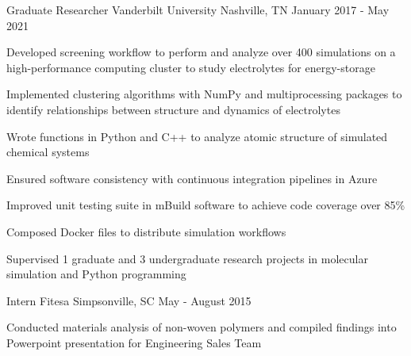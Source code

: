 
\begin{cventries}
  \cventry
    {Graduate Researcher} %
    {Vanderbilt University} %
    {Nashville, TN} %
    {January 2017 - May 2021} %
    {
        \begin{cvfirstitemstitle}
        \end{cvfirstitemstitle}
      \begin{cvsubitems} %
        \item{Developed screening workflow to perform and analyze over 400
            simulations on a high-performance \newline computing cluster to study
              electrolytes for energy-storage}
        \item{Implemented clustering algorithms with NumPy and multiprocessing
            packages to identify relationships \newline between structure and dynamics of
              electrolytes}
        \item{Wrote functions in Python and C++ to analyze atomic structure of
            simulated chemical systems}
      \end{cvsubitems}
      \begin{cvitemstitle}
      \end{cvitemstitle}
      \begin{cvsubitems}
        \item{Ensured software consistency with continuous integration
            pipelines in Azure}
        \item{Improved unit testing suite in mBuild software to achieve code coverage over
            85\%}
        \item{Composed Docker files to distribute simulation workflows}
        \item {Supervised 1 graduate and 3 undergraduate research 
            projects in molecular simulation and Python programming}
      \end{cvsubitems}
    }


  \cventry
    {Intern} %
    {Fitesa} %
    {Simpsonville, SC} %
    {May - August 2015} %
    {
      \begin{cvitems} %
        \item{Conducted materials analysis of non-woven polymers and compiled
            findings into Powerpoint \newline presentation for Engineering Sales Team}
      \end{cvitems}
    }
\end{cventries}
